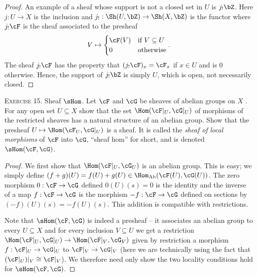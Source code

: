 \begin{problemset}
\begin{proof}
		An example of a sheaf whose support is not a closed set in $U$ is $j_!\bZ$. Here $j:U\to X$ is the inclusion and $j_!:\Sh(U,\bZ)\to \Sh(X,\bZ)$ is the functor where $j_!\cF$ is the sheaf associated to the presheaf
		\begin{align*}
			V \mapsto
			\begin{cases}
				\cF(V) &\text{if } V\subseteq U \\
				0 & \text{otherwise}
			\end{cases}.
		\end{align*}
		The sheaf $j_!\cF$ has the property that $(j_!\cF)_x = \cF_x$ if $x \in U$ and is $0$ otherwise. Hence, the support of $j_!\bZ$ is simply $U$, which is open, not necessarily closed.
	\end{proof}
	\item[\textsc{Exercise 15.}] Sheaf $\sHom$. Let $\cF$ and $\cG$ be sheaves of abelian groups on $X$ . For any open set $U\subseteq X$ show that the set $\Hom(\cF|_U,\cG|_U)$ of morphisms of the restricted sheaves has a natural structure of an abelian group. Show that the presheaf $U\mapsto \Hom(\cF_U,\cG|_U)$ is a sheaf. It is called the \emph{sheaf of local morphisms} of $\cF$ into $\cG$, ``sheaf hom'' for short, and is denoted $\sHom(\cF,\cG)$.
	\begin{proof}
		We first show that $\Hom(\cF|_U,\cG_U)$ is an abelian group. This is easy; we simply define $(f+g)(U) = f(U) + g(U) \in \Hom_{\text{Ab}}(\cF(U), \cG(U))$. The zero morphism $0:\cF\to \cG$ defined $0(U)(s) = 0$ is the identity and the inverse of a map $f:\cF\to \cG$ is the morphism $-f:\cF\to \cG$ defined on sections by $(-f)(U)(s) = -f(U)(s)$. This addition is compatible with restrictions.

		Note that $\sHom(\cF,\cG)$ is indeed a presheaf -- it associates an abelian group to every $U\subseteq X$ and for every inclusion $V\subseteq U$ we get a restriction $\Hom(\cF|_U,\cG|_U) \to \Hom(\cF|_V,\cG_V)$ given by restriction a morphism $f:\cF|_U\to \cG|_U$ to $\cF|_V\to \cG|_V$ (here we are technically using the fact that $(\cF|_U)|_V \cong \cF|_V$). We therefore need only show the two locality conditions hold for $\sHom(\cF,\cG)$.

		\bigskip


\end{proof}
\end{problemset}
